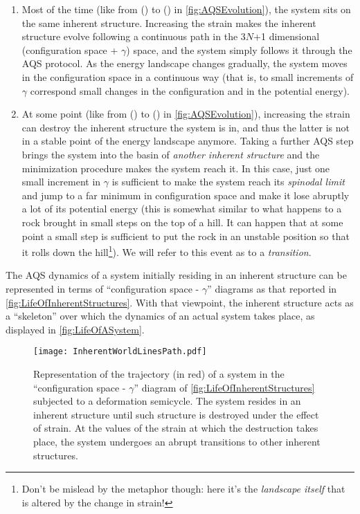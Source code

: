 \begin{enumerate}
	\item Most of the time (like from () to () in \autoref{fig:AQSEvolution}), the system sits on the same inherent structure. Increasing the strain makes the inherent structure evolve following a continuous path in the 3$N$+1 dimensional (configuration space + $\gamma$) space, and the system simply follows it through the AQS protocol. As the energy landscape changes gradually, the system moves in the configuration space in a continuous way (that is, to small increments of $\gamma$ correspond small changes in the configuration and in the potential energy). 
	\item At some point (like from () to () in \autoref{fig:AQSEvolution}), increasing the strain can destroy the inherent structure the system is in, and thus the latter is not in a stable point of the energy landscape anymore. Taking a further AQS step brings the system into the basin of \emph{another inherent structure} and the minimization procedure makes the system reach it. In this case, just one small increment in $\gamma$ is sufficient to make the system reach its \emph{spinodal limit} and jump to a far minimum in configuration space and make it lose abruptly a lot of its potential energy (this is somewhat similar to what happens to a rock brought in small steps on the top of a hill. It can happen that at some point a small step is sufficient to put the rock in an unstable position so that it rolls down the hill\footnote{Don't be mislead by the metaphor though: here it's the \emph{landscape itself} that is altered by the change in strain!}). We will refer to this event as to a \emph{transition}.
\end{enumerate}

The AQS dynamics of a system initially residing in an inherent structure can be represented in terms of ``configuration space - $\gamma$'' diagrams as that reported in \autoref{fig:LifeOfInherentStructures}. With that viewpoint, the inherent structure acts as a ``skeleton'' over which the dynamics of an actual system takes place, as displayed in \autoref{fig:LifeOfASystem}.

\begin{figure}[!h] 
\centering 
\texttt{[image: InherentWorldLinesPath.pdf]} 
\caption{Representation of the trajectory (in red) of a system in the ``configuration space - $\gamma$'' diagram of \autoref{fig:LifeOfInherentStructures} subjected to a deformation semicycle. The system resides in an inherent structure until such structure is destroyed under the effect of strain. At the values of the strain at which the destruction takes place, the system undergoes an abrupt transitions to other inherent structures.\label{fig:LifeOfASystem}}
\end{figure}

